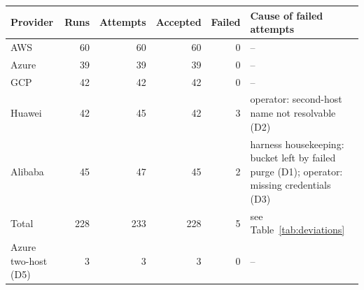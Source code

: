 \begin{tabular}{lrrrrp{4.2cm}}
\toprule
Provider & Runs & Attempts & Accepted & Failed & Cause of failed attempts \\
\midrule
AWS & 60 & 60 & 60 & 0 & -- \\
Azure & 39 & 39 & 39 & 0 & -- \\
GCP & 42 & 42 & 42 & 0 & -- \\
Huawei & 42 & 45 & 42 & 3 & operator: second-host name not resolvable (D2) \\
Alibaba & 45 & 47 & 45 & 2 & harness housekeeping: bucket left by failed purge (D1); operator: missing credentials (D3) \\
\midrule
Total & 228 & 233 & 228 & 5 & see Table~\ref{tab:deviations} \\
Azure two-host (D5) & 3 & 3 & 3 & 0 & -- \\
\bottomrule
\end{tabular}
